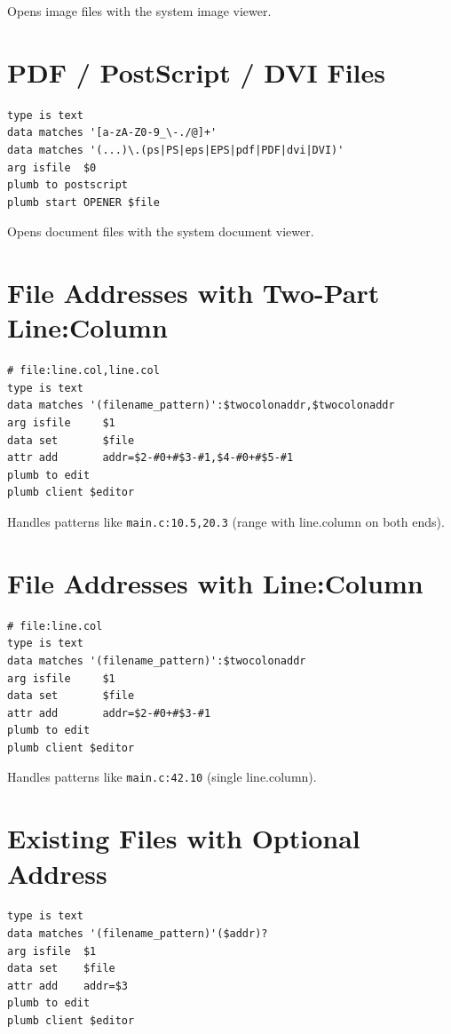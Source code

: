 Opens image files with the system image viewer.

\section{PDF / PostScript / DVI Files}

\begin{lstlisting}[frame=none,basicstyle=\small\ttfamily]
type is text
data matches '[a-zA-Z0-9_\-./@]+'
data matches '(...)\.(ps|PS|eps|EPS|pdf|PDF|dvi|DVI)'
arg isfile  $0
plumb to postscript
plumb start OPENER $file
\end{lstlisting}

Opens document files with the system document viewer.

\section{File Addresses with Two-Part Line:Column}

\begin{lstlisting}[frame=none,basicstyle=\small\ttfamily]
# file:line.col,line.col
type is text
data matches '(filename_pattern)':$twocolonaddr,$twocolonaddr
arg isfile     $1
data set       $file
attr add       addr=$2-#0+#$3-#1,$4-#0+#$5-#1
plumb to edit
plumb client $editor
\end{lstlisting}

Handles patterns like \texttt{main.c:10.5,20.3} (range with
line.column on both ends).

\section{File Addresses with Line:Column}

\begin{lstlisting}[frame=none,basicstyle=\small\ttfamily]
# file:line.col
type is text
data matches '(filename_pattern)':$twocolonaddr
arg isfile     $1
data set       $file
attr add       addr=$2-#0+#$3-#1
plumb to edit
plumb client $editor
\end{lstlisting}

Handles patterns like \texttt{main.c:42.10} (single line.column).

\section{Existing Files with Optional Address}

\begin{lstlisting}[frame=none,basicstyle=\small\ttfamily]
type is text
data matches '(filename_pattern)'($addr)?
arg isfile  $1
data set    $file
attr add    addr=$3
plumb to edit
plumb client $editor
\end{lstlisting}

